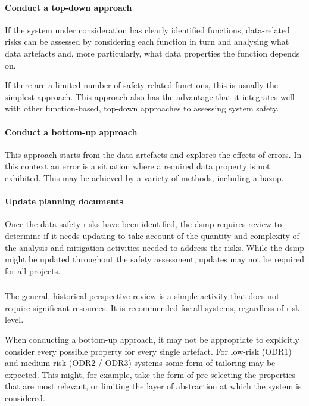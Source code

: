 \paragraph{Conduct a top-down approach}
If the system under consideration has clearly identified functions, data-related risks can be assessed by considering each function in turn and analysing what \glspl{data artefact} and, more particularly, what data properties the function depends on.

If there are a limited number of safety-related functions, this is usually the simplest approach. This approach also has the advantage that it integrates well with other function-based, top-down approaches to assessing system safety. 

\paragraph{Conduct a bottom-up approach}
This approach starts from the \glspl{data artefact} and explores the effects of \glspl{error}. In this context an error is a situation where a required \gls{data property} is not exhibited. This may be achieved by a variety of methods, including a \gls{hazop}.

\paragraph{Update planning documents}
Once the data safety risks have been identified, the \gls{dsmp} requires review to determine if it needs
updating to take account of the quantity and complexity of the analysis and \gls{mitigation} activities needed to address the risks. While the \gls{dsmp} might be updated throughout the \gls{safety assessment}, updates may not be required for all projects.

\subsubsection{}
The general, historical perspective review is a simple activity that does not require significant resources. It is recommended for all systems, regardless of risk level.

When conducting a bottom-up approach, it may not be appropriate to explicitly consider every possible property for every single artefact. For low-risk (ODR1) and medium-risk (ODR2 / ODR3) systems some form of \gls{tailoring} may be expected. This might, for example, take the form of pre-selecting the properties that are most relevant, or limiting the layer of abstraction at which the system is considered.

